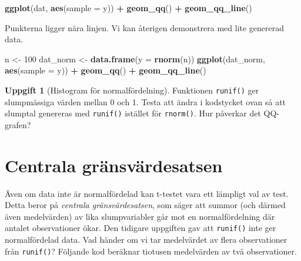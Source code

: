\documentclass[
]{book}
\newenvironment{Shaded}{\begin{snugshade}}{\end{snugshade}}
\newcommand{\AttributeTok}[1]{\textcolor[rgb]{0.13,0.29,0.53}{#1}}
\newcommand{\DecValTok}[1]{\textcolor[rgb]{0.00,0.00,0.81}{#1}}
\newcommand{\FunctionTok}[1]{\textcolor[rgb]{0.13,0.29,0.53}{\textbf{#1}}}
\newcommand{\NormalTok}[1]{#1}
\newcommand{\OtherTok}[1]{\textcolor[rgb]{0.56,0.35,0.01}{#1}}
\newcommand{\SpecialCharTok}[1]{\textcolor[rgb]{0.81,0.36,0.00}{\textbf{#1}}}
\theoremstyle{definition}
\theoremstyle{definition}
\theoremstyle{definition}
\newtheorem{exercise}{Uppgift}[chapter]
\theoremstyle{definition}
\theoremstyle{remark}
\begin{document}
\begin{Shaded}
\begin{Highlighting}[]
\FunctionTok{ggplot}\NormalTok{(dat, }\FunctionTok{aes}\NormalTok{(}\AttributeTok{sample =}\NormalTok{ y)) }\SpecialCharTok{+} \FunctionTok{geom\_qq}\NormalTok{() }\SpecialCharTok{+} \FunctionTok{geom\_qq\_line}\NormalTok{()}
\end{Highlighting}
\end{Shaded}

Punkterna ligger nära linjen. Vi kan återigen demonstrera med lite genererad data.

\begin{Shaded}
\begin{Highlighting}[]
\NormalTok{n }\OtherTok{\textless{}{-}} \DecValTok{100}
\NormalTok{dat\_norm }\OtherTok{\textless{}{-}} \FunctionTok{data.frame}\NormalTok{(}\AttributeTok{y =} \FunctionTok{rnorm}\NormalTok{(n))}
\FunctionTok{ggplot}\NormalTok{(dat\_norm, }\FunctionTok{aes}\NormalTok{(}\AttributeTok{sample =}\NormalTok{ y)) }\SpecialCharTok{+} \FunctionTok{geom\_qq}\NormalTok{() }\SpecialCharTok{+} \FunctionTok{geom\_qq\_line}\NormalTok{()}
\end{Highlighting}
\end{Shaded}

\begin{exercise}[Histogram för normalfördelning]
Funktionen \texttt{runif()} ger slumpmässiga värden mellan 0 och 1. Testa att ändra i kodstycket ovan så att slumptal genereras med \texttt{runif()} istället för \texttt{rnorm()}. Hur påverkar det QQ-grafen?
\end{exercise}

\section{Centrala gränsvärdesatsen}\label{centrala-gruxe4nsvuxe4rdesatsen}

Även om data inte är normalfördelad kan t-testet vara ett lämpligt val av test. Detta beror på \emph{centrala gränsvärdesatsen}, som säger att summor (och därmed även medelvärden) av lika slumpvariabler går mot en normalfördelning där antalet observationer ökar. Den tidigare uppgiften gav att \texttt{runif()} inte ger normalfördelad data. Vad händer om vi tar medelvärdet av flera observationer från \texttt{runif()}? Följande kod beräknar tiotusen medelvärden av två observationer.
\end{document}
